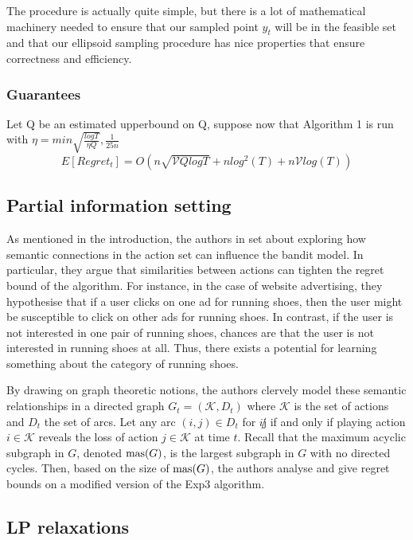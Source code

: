 The procedure is actually quite simple, but there is a lot of mathematical machinery needed to
ensure that our sampled point $y_t$ will be in the feasible set and that our ellipsoid sampling
procedure has nice properties that ensure correctness and efficiency. 

\subsubsection{Guarantees}


Let Q be an estimated upperbound on Q, suppose now that Algorithm 1 is run with
$\eta = min{\sqrt{\frac{log T}{\eta Q}}, \frac{1}{25n}}$
\begin{equation}
E[Regret_t] = O(n \sqrt{\mathcal{V}Q log T} + n log^2(T) + n \mathcal{V}log(T))
\end{equation}

\subsection{Partial information setting}
As mentioned in the introduction, the authors in \citep{alon} set about exploring how semantic connections in the action set can influence the bandit model. In particular, they argue that similarities between actions can tighten the regret bound of the algorithm. For instance, in the case of website advertising, they hypothesise that if a user clicks on one ad for running shoes, then the user might be susceptible to click on other ads for running shoes. In contrast, if the user is not interested in one pair of running shoes, chances are that the user is not interested in running shoes at all. Thus, there exists a potential for learning something about the category of running shoes. 

By drawing on graph theoretic notions, the authors clervely model these semantic relationships in a directed graph $G_t=(\mathcal{K},D_t)$ where $\mathcal{K}$ is the set of actions and $D_t$ the set of arcs. Let any arc $(i,j)\in D_t$ for $i\not j$ if and only if playing action $i\in\mathcal{K}$ reveals the loss of action $j\in \mathcal{K}$ at time $t$. Recall that the maximum acyclic subgraph in $G$, denoted $\text{mas}(G)$, is the largest subgraph in $G$ with no directed cycles. Then, based on the size of $\text{mas}(G)$, the authors analyse and give regret bounds on a modified version of the Exp3 algorithm.   

\subsection{LP relaxations}
